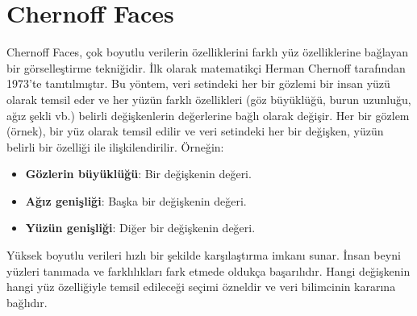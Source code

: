 \section{Chernoff Faces}

Chernoff Faces, çok boyutlu verilerin özelliklerini farklı yüz özelliklerine bağlayan bir görselleştirme tekniğidir. İlk olarak matematikçi Herman Chernoff tarafından 1973'te tanıtılmıştır. Bu yöntem, veri setindeki her bir gözlemi bir insan yüzü olarak temsil eder ve her yüzün farklı özellikleri (göz büyüklüğü, burun uzunluğu, ağız şekli vb.) belirli değişkenlerin değerlerine bağlı olarak değişir.
Her bir gözlem (örnek), bir yüz olarak temsil edilir ve veri setindeki her bir değişken, yüzün belirli bir özelliği ile ilişkilendirilir. Örneğin:

\begin{itemize}
    \item \textbf{Gözlerin büyüklüğü}: Bir değişkenin değeri.
    \item \textbf{Ağız genişliği}: Başka bir değişkenin değeri.
    \item \textbf{Yüzün genişliği}: Diğer bir değişkenin değeri.
\end{itemize}

Yüksek boyutlu verileri hızlı bir şekilde karşılaştırma imkanı sunar. İnsan beyni yüzleri tanımada ve farklılıkları fark etmede oldukça başarılıdır. Hangi değişkenin hangi yüz özelliğiyle temsil edileceği seçimi özneldir ve veri bilimcinin kararına bağlıdır.

\newpage